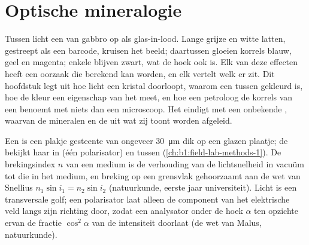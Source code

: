 \chapter{Optische mineralogie}\label{ch:b1:optical-mineralogy}

Tussen  licht een  van gabbro op als glas-in-lood. Lange grijze en witte latten,
gestreept als een barcode, kruisen het beeld; daartussen gloeien korrels blauw, geel en magenta; enkele blijven zwart, wat de
hoek ook is. Elk van deze effecten heeft een oorzaak die berekend kan worden, en elk vertelt welk  er zit. Dit hoofdstuk
legt uit hoe licht een kristal doorloopt, waarom een  tussen  gekleurd is, hoe de kleur een eigenschap
van het  meet, en hoe een petroloog de korrels van een  benoemt met niets dan een microscoop. Het eindigt met een
onbekende , waarvan de mineralen en de  uit wat zij toont worden afgeleid.

\begin{recall}
Een  is een plakje gesteente van ongeveer \qty{30}{\micro m} dik op een glazen plaatje; de 
bekijkt haar in  (één polarisator) en tussen  (\cref{ch:b1:field-lab-methods-1}). De
brekingsindex $n$ van een medium is de verhouding van de lichtsnelheid in vacuüm tot die in het medium, en breking op een grensvlak
gehoorzaamt aan de wet van Snellius $n_1\sin i_1 = n_2\sin i_2$ (natuurkunde, eerste jaar universiteit). Licht is een transversale
golf; een polarisator laat alleen de component van het elektrische veld langs zijn richting door, zodat een analysator onder de hoek
$\alpha$ ten opzichte ervan de fractie $\cos^2\alpha$ van de intensiteit doorlaat (de wet van Malus, natuurkunde).
\end{recall}

